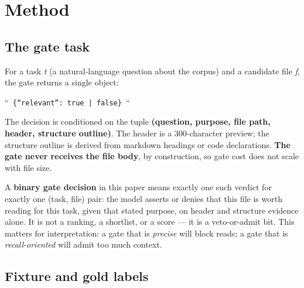 \documentclass[11pt,a4paper]{article}
\begin{document}
\section{Method}

\subsection{The gate task}

For a task \emph{t} (a natural-language question about the corpus) and a candidate file \emph{f}, the gate returns a single object:

``\texttt{ \{``relevant'': true | false\} }``

The decision is conditioned on the tuple \textbf{(question, purpose, file path, header, structure outline)}. The header is a 300-character preview; the structure outline is derived from markdown headings or code declarations. \textbf{The gate never receives the file body}, by construction, so gate cost does not scale with file size.

A \textbf{binary gate decision} in this paper means exactly one such verdict for exactly one (task, file) pair: the model asserts or denies that this file is worth reading for this task, given that stated purpose, on header and structure evidence alone. It is not a ranking, a shortlist, or a score --- it is a veto-or-admit bit. This matters for interpretation: a gate that is \emph{precise} will block reads; a gate that is \emph{recall-oriented} will admit too much context.

\subsection{Fixture and gold labels}
\end{document}
